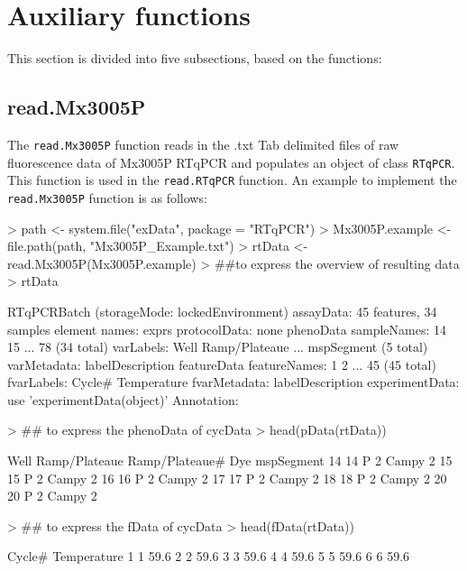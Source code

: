 \documentclass[11pt]{article}
\newcommand{\code}[1]{{\tt #1}}
\begin{document}
\section{Auxiliary functions} 
This section is divided into five subsections, based on the functions:
\subsection{read.Mx3005P} 
The \code{read.Mx3005P} function reads in the .txt Tab delimited files of raw fluorescence data of Mx3005P RTqPCR and populates an object of class \code{RTqPCR}. This function is used in the \code{read.RTqPCR} function. An example to implement the \code{read.Mx3005P} function is as follows:

\begin{Schunk}
\begin{Sinput}
> path <- system.file("exData", package = "RTqPCR")
> Mx3005P.example <- file.path(path, "Mx3005P_Example.txt") 
> rtData <- read.Mx3005P(Mx3005P.example)
> ##to express the overview of resulting data
> rtData  
\end{Sinput}
\begin{Soutput}
RTqPCRBatch (storageMode: lockedEnvironment)
assayData: 45 features, 34 samples 
  element names: exprs 
protocolData: none
phenoData
  sampleNames: 14 15 ... 78 (34 total)
  varLabels: Well Ramp/Plateaue ... mspSegment (5 total)
  varMetadata: labelDescription
featureData
  featureNames: 1 2 ... 45 (45 total)
  fvarLabels: Cycle# Temperature
  fvarMetadata: labelDescription
experimentData: use 'experimentData(object)'
Annotation:  
\end{Soutput}
\begin{Sinput}
> ## to express the phenoData of cycData
> head(pData(rtData)) 
\end{Sinput}
\begin{Soutput}
   Well Ramp/Plateaue Ramp/Plateaue#   Dye mspSegment
14   14             P              2 Campy          2
15   15             P              2 Campy          2
16   16             P              2 Campy          2
17   17             P              2 Campy          2
18   18             P              2 Campy          2
20   20             P              2 Campy          2
\end{Soutput}
\begin{Sinput}
> ## to express the fData of cycData
> head(fData(rtData)) 
\end{Sinput}
\begin{Soutput}
  Cycle# Temperature
1      1        59.6
2      2        59.6
3      3        59.6
4      4        59.6
5      5        59.6
6      6        59.6
\end{Soutput}
\end{Schunk}
\end{document}
